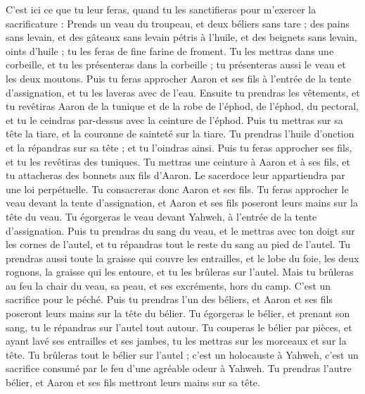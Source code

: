 \begin{multicols}{2}
\VerseOne{}C'est ici ce que tu leur feras, quand tu les sanctifieras pour m'exercer la sacrificature : Prends un veau du troupeau, et deux béliers sans tare ;
des pains sans levain, et des gâteaux sans levain pétris à l'huile, et des beignets sans levain, oints d'huile ; tu les feras de fine farine de froment.
Tu les mettras dans une corbeille, et tu les présenteras dans la corbeille ; tu présenteras aussi le veau et les deux moutons.
Puis tu feras approcher Aaron et ses fils à l'entrée de la tente d'assignation, et tu les laveras avec de l'eau.
Ensuite tu prendras les vêtements, et tu revêtiras Aaron de la tunique et de la robe de l'éphod, de l'éphod, du pectoral, et tu le ceindras par-dessus avec la ceinture de l'éphod.
Puis tu mettras sur sa tête la tiare, et la couronne de sainteté sur la tiare.
Tu prendras l'huile d'onction et la répandras sur sa tête ; et tu l'oindras ainsi.
Puis tu feras approcher ses fils, et tu les revêtiras des tuniques.
Tu mettras une ceinture à Aaron et à ses fils, et tu attacheras des bonnets aux fils d’Aaron. Le sacerdoce leur appartiendra par une loi perpétuelle. Tu consacreras donc Aaron et ses fils.
Tu feras approcher le veau devant la tente d'assignation, et Aaron et ses fils poseront leurs mains sur la tête du veau.
Tu égorgeras le veau devant Yahweh, à l'entrée de la tente d'assignation.
Puis tu prendras du sang du veau, et le mettras avec ton doigt sur les cornes de l'autel, et tu répandras tout le reste du sang au pied de l'autel.
Tu prendras aussi toute la graisse qui couvre les entrailles, et le lobe du foie, les deux rognons, la graisse qui les entoure, et tu les brûleras sur l'autel.
Mais tu brûleras au feu la chair du veau, sa peau, et ses excréments, hors du camp. C'est un sacrifice pour le péché.
Puis tu prendras l'un des béliers, et Aaron et ses fils poseront leurs mains sur la tête du bélier.
Tu égorgeras le bélier, et prenant son sang, tu le répandras sur l'autel tout autour.
Tu couperas le bélier par pièces, et ayant lavé ses entrailles et ses jambes, tu les mettras sur les morceaux et sur la tête.
Tu brûleras tout le bélier sur l'autel ; c'est un holocauste à Yahweh, c’est un sacrifice consumé par le feu d’une agréable odeur à Yahweh.
Tu prendras l'autre bélier, et Aaron et ses fils mettront leurs mains sur sa tête.

\end{multicols}
